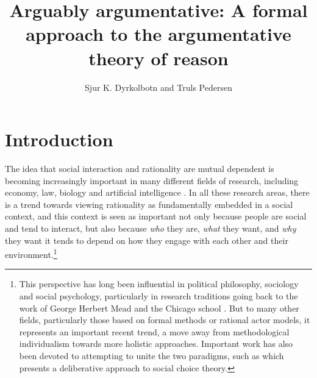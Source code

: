 \documentclass[greybox]{svmult}
\begin{document}
\title*{Arguably argumentative: A formal approach to the argumentative theory of reason}
\author{Sjur K. Dyrkolbotn and Truls Pedersen}

\maketitle


\section{Introduction}\label{sec:intro}

The idea that social interaction and rationality are mutual dependent is becoming increasingly important in many different fields of research, including economy, law, biology and artificial intelligence \cite{blume,terrell,waal,benthem,ossowski}. In all these research areas, there is a trend towards viewing rationality as fundamentally embedded in a social context, and this context is seen as important not only because people are social and tend to interact, but also because \emph{who} they are, \emph{what} they want, and \emph{why} they want it tends to depend on how they engage with each other and their environment.\footnote{This perspective has long been influential in political philosophy, sociology and social psychology, particularly in research traditions going back to the work of George Herbert Mead and the Chicago school \cite{mead}. But to many other fields, particularly those based on formal methods or rational actor models, it represents an important recent trend, a move away from methodological individualism towards more holistic approaches. Important work has also been devoted to attempting to unite the two paradigms, such as \cite{list} which presents a deliberative approach to social choice theory.}
\end{document}
